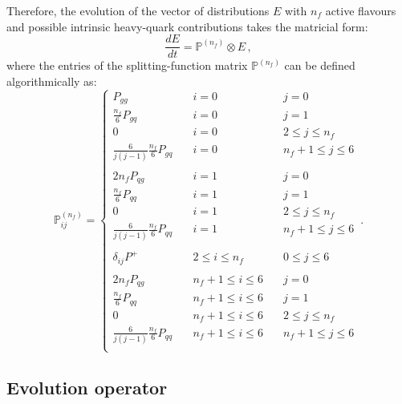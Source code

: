 \documentclass[10pt,a4paper]{article}
\begin{document}
Therefore, the evolution of the vector of distributions $E$ with $n_f$
active flavours and possible intrinsic heavy-quark contributions takes
the matricial form:
\begin{equation}\label{eq:DGLAPE}
\frac{dE}{dt} = \mathbb{P}^{(n_f)}\otimes E\,,
\end{equation}
where the entries of the splitting-function matrix
$\mathbb{P}^{(n_f)}$ can be defined algorithmically as:
\begin{equation}\label{eq:splittingalg}
\mathbb{P}_{ij}^{(n_f)}=
\left\{
\begin{array}{lll}
P_{gg} & \quad i = 0 &\quad j = 0\\
\frac{n_f}{6}P_{gq} & \quad i = 0 & \quad j=1\\
0 &\quad i = 0 & \quad 2 \leq j \leq n_f\\
\frac{6}{j(j-1)}\frac{n_f}{6}P_{gq} &\quad i = 0 & \quad n_f+1 \leq j \leq 6\\
\\
2n_fP_{qg} & \quad i = 1 &\quad j = 0\\
\frac{n_f}{6}P_{qq} & \quad i = 1 & \quad j=1\\
0 &\quad i = 1 & \quad 2 \leq j \leq n_f\\
\frac{6}{j(j-1)}\frac{n_f}{6}P_{qq} &\quad i = 1 & \quad n_f+1 \leq j \leq 6\\
\\
\delta_{ij}P^+ & \quad 2 \leq i \leq n_f & \quad 0 \leq j \leq 6\\
\\
2n_fP_{qg} & \quad n_f+1 \leq i \leq 6  &\quad j = 0\\
\frac{n_f}{6}P_{qq} & \quad n_f+1 \leq i \leq 6  & \quad j=1\\
0 &\quad n_f+1 \leq i \leq 6 & \quad 2 \leq j \leq n_f\\
\frac{6}{j(j-1)}\frac{n_f}{6}P_{qq} &\quad n_f+1 \leq i \leq 6 & \quad n_f+1 \leq j \leq 6\\
\end{array}
\right.\,.
\end{equation}

\subsection{Evolution operator}
\end{document}
